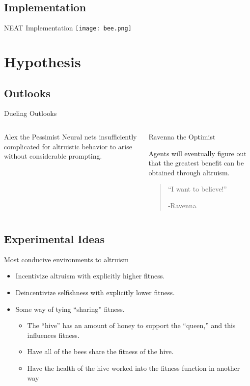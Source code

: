 \documentclass{beamer}
\begin{document}
	\subsection{Implementation}
	\begin{frame}{NEAT Implementation}
		\texttt{[image: bee.png]}
	\end{frame}

	\section{Hypothesis}


	\subsection{Outlooks}
	\begin{frame}{Dueling Outlooks}
		\begin{columns}[t]

				\begin{block}{Alex the Pessimist}
						Neural nets insufficiently complicated for altruistic behavior to arise without considerable prompting.
				\end{block}

				\begin{block}{Ravenna the Optimist}
		
						Agents will eventually figure out that the greatest benefit can be obtained through altruism.
					\begin{quote}
						``I want to believe!''
						\begin{flushright}
						 	-Ravenna
						\end{flushright} 
					\end{quote}
				\end{block}

		\end{columns}
	\end{frame}

	\subsection{Experimental Ideas}
	\begin{frame}{Most conducive environments to altruism}
		\begin{itemize}
			\item Incentivize altruism with explicitly higher fitness.
			\item Deincentivize selfishness with explicitly lower fitness.

			\item Some way of tying ``sharing'' fitness.
			\begin{itemize}
				\item The ``hive'' has an amount of honey to support the ``queen,'' and this influences fitness.
				\item Have all of the bees share the fitness of the hive.
				\item Have the health of the hive worked into the fitness function in another way
			\end{itemize}
		\end{itemize}
	\end{frame}
\end{document}
